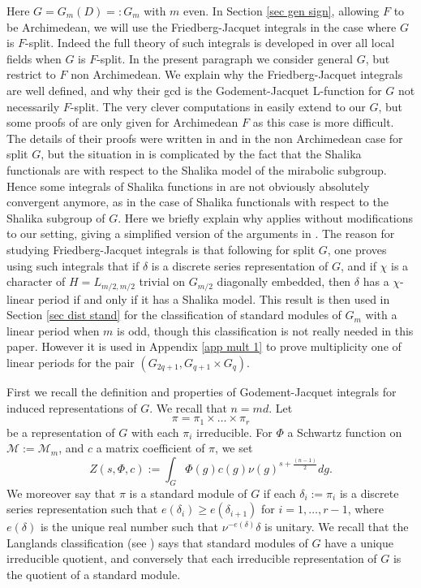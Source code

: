 \documentclass[11pt,letterpaper]{amsart}
\newcommand{\CM}{{\mathcal {M}}} \newcommand{\CN}{{\mathcal {N}}}\newcommand{\CO}{{\mathcal {O}}}\newcommand{\CP}{{\mathcal {P}}}
\def\d{\delta}
\theoremstyle{plain}
\numberwithin{equation}{section}
\begin{document}
Here $G=G_m(D)=:G_m$ with $m$ even. In Section \ref{sec gen sign}, allowing $F$ to be Archimedean, we will use the Friedberg-Jacquet integrals in the case where $G$ is $F$-split. Indeed the full theory of such integrals is developed in \cite{FJ} over all local fields when $G$ is $F$-split. In the present paragraph we consider general $G$, but restrict to $F$ non Archimedean. We explain why the Friedberg-Jacquet integrals are well defined, and why their gcd is the Godement-Jacquet L-function for $G$ not necessarily $F$-split. The very clever computations in \cite{FJ} easily extend to our $G$, but some proofs of \cite{FJ} are only given for Archimedean $F$ as this case is more difficult. The details of their proofs were written in \cite{MatJNT} and \cite{MatBF2} in the non Archimedean case for split $G$, but the situation in \cite{MatJNT} is complicated by the fact that the Shalika functionals are with respect to the Shalika model of the mirabolic subgroup. Hence some integrals of Shalika functions in \cite{MatJNT} are not obviously absolutely convergent anymore, as in the case of Shalika functionals with respect to the Shalika subgroup of $G$. Here we briefly explain why \cite{FJ} applies without modifications to our setting, giving a simplified version of the arguments in \cite{MatJNT}. The reason for studying Friedberg-Jacquet integrals is that following \cite{MatBF2} for split $G$, one proves using such integrals that if $\delta$ is a discrete series representation of $G$, and if $\chi$ is a character of $H=L_{m/2,m/2}$ trivial on $G_{m/2}$ diagonally embedded, then $\delta$ has a $\chi$-linear period if and only if it has a Shalika model. This result is then used in Section \ref{sec dist stand} for the classification of standard modules of $G_m$ with a linear period when $m$ is odd, though this classification is not really needed in this paper. However it is used in Appendix \ref{app mult 1} to prove multiplicity one of linear periods for the pair $(G_{2q+1},G_{q+1}\times G_{q})$.

First we recall the definition and properties of Godement-Jacquet integrals for induced representations of $G$. We recall that $n=md$. Let
\[\pi=\pi_1\times \dots \times \pi_r\] be a representation of $G$ with each $\pi_i$ irreducible. For $\Phi$ a Schwartz function on $\CM:=\CM_m$, and $c$ a matrix coefficient of $\pi$, we set 
\[Z(s,\Phi,c):=\int_G \Phi(g)c(g)\nu(g)^{s+\frac{(n-1)}{2}} dg .\]
We moreover say that $\pi$ is a standard module of $G$ if each $\d_i:=\pi_i$ is a discrete series representation such that $e(\delta_i)\geq e(\delta_{i+1})$ for $i=1,\dots,r-1$, where $e(\delta)$ is the unique real number such that $\nu^{-e(\delta)} \delta$ is unitary. We recall that the Langlands classification (see \cite{Tglna}) says that standard modules of $G$ have a unique irreducible quotient, and conversely that each irreducible representation of $G$ is the quotient of a standard module. 
\end{document}
